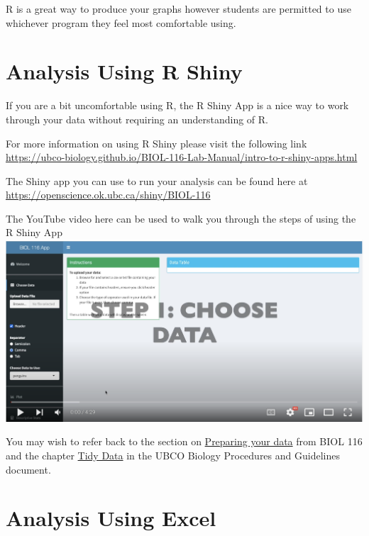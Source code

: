 \documentclass[
]{book}
\begin{document}
R is a great way to produce your graphs however students are permitted to use whichever program they feel most comfortable using.

\hypertarget{analysis-using-r-shiny}{%
\chapter*{Analysis Using R Shiny}\label{analysis-using-r-shiny}}

If you are a bit uncomfortable using R, the R Shiny App is a nice way to work through your data without requiring an understanding of R.

For more information on using R Shiny please visit the following link \url{https://ubco-biology.github.io/BIOL-116-Lab-Manual/intro-to-r-shiny-apps.html}

The Shiny app you can use to run your analysis can be found here at \url{https://openscience.ok.ubc.ca/shiny/BIOL-116}

The YouTube video here can be used to walk you through the steps of using the R Shiny App \includegraphics{images/shiny-app.png}

You may wish to refer back to the section on \href{https://ubco-biology.github.io/BIOL-116-Lab-Manual/preparing-your-data.html}{Preparing your data} from BIOL 116 and the chapter \href{https://ubco-biology.github.io/Procedures-and-Guidelines/tidy-data.html}{Tidy Data} in the UBCO Biology Procedures and Guidelines document.

\hypertarget{analysis-using-excel}{%
\chapter*{Analysis Using Excel}\label{analysis-using-excel}}
\end{document}
